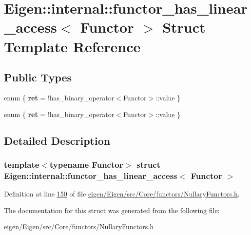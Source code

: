 \hypertarget{struct_eigen_1_1internal_1_1functor__has__linear__access}{}\section{Eigen\+:\+:internal\+:\+:functor\+\_\+has\+\_\+linear\+\_\+access$<$ Functor $>$ Struct Template Reference}
\label{struct_eigen_1_1internal_1_1functor__has__linear__access}
\subsection*{Public Types}
\begin{DoxyCompactItemize}
\item 
\mbox{\label{struct_eigen_1_1internal_1_1functor__has__linear__access_a950f08854efc02c293736aa9572611f4}} 
enum \{ {\bfseries ret} = !has\+\_\+binary\+\_\+operator$<$Functor$>$\+:\+:value
 \}
\item 
\mbox{\label{struct_eigen_1_1internal_1_1functor__has__linear__access_aecbd744586c151a2a8715bbacd3f22ae}} 
enum \{ {\bfseries ret} = !has\+\_\+binary\+\_\+operator$<$Functor$>$\+:\+:value
 \}
\end{DoxyCompactItemize}


\subsection{Detailed Description}
\subsubsection*{template$<$typename Functor$>$\newline
struct Eigen\+::internal\+::functor\+\_\+has\+\_\+linear\+\_\+access$<$ Functor $>$}



Definition at line \hyperlink{eigen_2_eigen_2src_2_core_2functors_2_nullary_functors_8h_source_l00150}{150} of file \hyperlink{eigen_2_eigen_2src_2_core_2functors_2_nullary_functors_8h_source}{eigen/\+Eigen/src/\+Core/functors/\+Nullary\+Functors.\+h}.



The documentation for this struct was generated from the following file\+:\begin{DoxyCompactItemize}
\item 
eigen/\+Eigen/src/\+Core/functors/\+Nullary\+Functors.\+h\end{DoxyCompactItemize}
